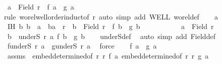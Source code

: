 \begin{isabellebody}
\ {\isachardoublequoteopen}a\ {\isasymin}\ Field\ r\ {\isasymlongrightarrow}\ f\ a\ {\isacharequal}{\kern0pt}\ g\ a{\isachardoublequoteclose}\isanewline
%
\isadelimproof
%
\endisadelimproof
%
\isatagproof
{}\isamarkupfalse%
{\isacharparenleft}{\kern0pt}rule\ wo{\isacharunderscore}{\kern0pt}rel{\isachardot}{\kern0pt}well{\isacharunderscore}{\kern0pt}order{\isacharunderscore}{\kern0pt}induct{\isacharbrackleft}{\kern0pt}of\ r{\isacharbrackright}{\kern0pt}{\isacharcomma}{\kern0pt}\ auto\ simp\ add{\isacharcolon}{\kern0pt}\ WELL\ wo{\isacharunderscore}{\kern0pt}rel{\isacharunderscore}{\kern0pt}def{\isacharparenright}{\kern0pt}\isanewline
\ \ \isamarkupfalse%
\ a\isanewline
\ \ \isamarkupfalse%
\ IH{\isacharcolon}{\kern0pt}\ {\isachardoublequoteopen}{\isasymforall}b{\isachardot}{\kern0pt}\ b\ {\isasymnoteq}\ a\ {\isasymand}\ {\isacharparenleft}{\kern0pt}b{\isacharcomma}{\kern0pt}a{\isacharparenright}{\kern0pt}\ {\isasymin}\ r\ {\isasymlongrightarrow}\ b\ {\isasymin}\ Field\ r\ {\isasymlongrightarrow}\ f\ b\ {\isacharequal}{\kern0pt}\ g\ b{\isachardoublequoteclose}\ \isanewline
\ \ \ \ \ \ \ \ \ {\isacharasterisk}{\kern0pt}{\isacharcolon}{\kern0pt}\ {\isachardoublequoteopen}a\ {\isasymin}\ Field\ r{\isachardoublequoteclose}\isanewline
\ \ \isamarkupfalse%
\ {\isachardoublequoteopen}{\isasymforall}b\ {\isasymin}\ underS\ r\ a{\isachardot}{\kern0pt}\ f\ b\ {\isacharequal}{\kern0pt}\ g\ b{\isachardoublequoteclose}\isanewline
\ \ \isamarkupfalse%
\ underS{\isacharunderscore}{\kern0pt}def\ \isamarkupfalse%
\ {\isacharparenleft}{\kern0pt}auto\ simp\ add{\isacharcolon}{\kern0pt}\ Field{\isacharunderscore}{\kern0pt}def{\isacharparenright}{\kern0pt}\isanewline
\ \ \isamarkupfalse%
\ {\isachardoublequoteopen}f{\isacharbackquote}{\kern0pt}{\isacharparenleft}{\kern0pt}underS\ r\ a{\isacharparenright}{\kern0pt}\ {\isacharequal}{\kern0pt}\ g{\isacharbackquote}{\kern0pt}{\isacharparenleft}{\kern0pt}underS\ r\ a{\isacharparenright}{\kern0pt}{\isachardoublequoteclose}\ \isamarkupfalse%
\ force\isanewline
\ \ \isamarkupfalse%
\ {\isachardoublequoteopen}f\ a\ {\isacharequal}{\kern0pt}\ g\ a{\isachardoublequoteclose}\isanewline
\ \ \isamarkupfalse%
\ assms\ {\isacharasterisk}{\kern0pt}\ embed{\isacharunderscore}{\kern0pt}determined{\isacharbrackleft}{\kern0pt}of\ r\ r{\isacharprime}{\kern0pt}\ f\ a{\isacharbrackright}{\kern0pt}\ embed{\isacharunderscore}{\kern0pt}determined{\isacharbrackleft}{\kern0pt}of\ r\ r{\isacharprime}{\kern0pt}\ g\ a{\isacharbrackright}{\kern0pt}\ \isamarkupfalse%

\end{isabellebody}
